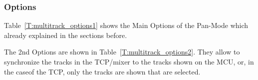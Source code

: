 \subsubsection{Options}
Table~\ref{T:multitrack_options1} shows the Main Options of the Pan-Mode which
already explained in the sections before.


The 2nd Options are shown in Table~\ref{T:multitrack_options2}. They allow to
synchronize the tracks in the TCP/mixer to the tracks shown on the MCU, or, in
the caseof the TCP, only the tracks are shown that are selected.


